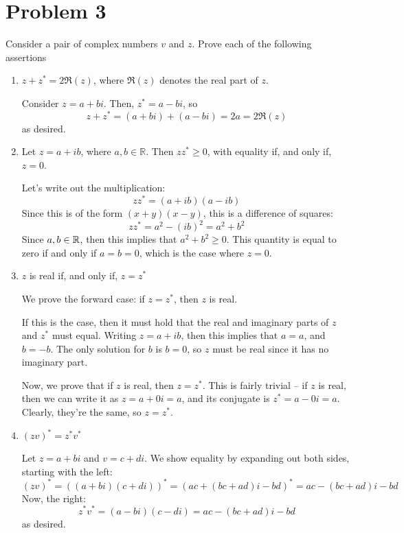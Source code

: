 \documentclass[10pt]{article}
\begin{document}
	\section*{Problem 3}
	Consider a pair of complex numbers \( v \) and \( z \). Prove each of the following assertions
	\begin{enumerate}[label=\alph*)]
		\item \( z + z^* = 2 \Re(z) \), where  \( \Re(z) \) denotes the real part of \( z \). 

			\begin{solution}
				Consider \( z = a + bi \). Then, \( z^{*} = a - bi \), so 
				\[
				z + z^* = (a + bi) + (a - bi) = 2a = 2\Re(z)
				\] 
				as desired. 
			\end{solution}
		\item Let \( z = a+ ib \), where \( a, b \in \mathbb R \). Then  \( z z^* \ge 0 \), with equality if, 
			and only if, \( z = 0 \).

			\begin{solution}
				Let's write out the multiplication:
				\[
				zz^* = (a + ib)(a - ib)
				\] 
				Since this is of the form \( (x + y)(x - y) \), this is a difference of squares: 
				\[
				zz^{*} = a^2 - (ib)^2 = a^2 + b^2
				\] 
				Since \( a, b \in \mathbb R \), then this implies that \( a^2 + b^2 \ge  0 \). This quantity is equal to zero 
				if and only if \( a = b = 0 \), which is the case where \( z = 0 \).  
			\end{solution}
		\item \( z \) is real if, and only if, \( z = z^{*} \) 

			\begin{solution}
				We prove the forward case: if \( z = z^* \), then \( z \) is real. 

				If this is the case, then it must hold that the real and imaginary parts of \( z \) and \( z^{*} \) 
				must equal. Writing \( z = a + ib \), then this implies that \( a = a \), and \( b = -b \). The only 
				solution for \( b \) is \( b = 0 \), so \( z \) must be real since it has no imaginary part. 

				Now, we prove that if \( z \) is real, then \( z = z^* \). This is fairly trivial -- if \( z \) 
				is real, then we can write it as \( z = a + 0i = a \), and its conjugate is \( z^* = a - 0i = a \). 
				Clearly, they're the same, so \( z = z^{*} \). 
 			\end{solution}
		\item \( (zv)^* = z^* v^* \)

			\begin{solution}
				Let \( z = a + bi \) and \( v = c + di \). We show equality by expanding out both sides, starting 
				with the left:
				\[
					(zv)^* = ((a + bi)(c + di))^* = (ac + (bc + ad)i - bd)^* = ac - (bc + ad)i - bd
				\] 
				Now, the right:
				\[
					z^*v^* = (a - bi)(c - di) = ac - (bc + ad)i - bd
				\] 
				as desired. 
			\end{solution}
	\end{enumerate}
	\pagebreak
\end{document}
